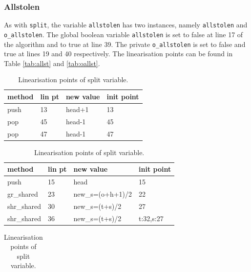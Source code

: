\documentclass{sig-alternate-br}
\begin{document}
\subsubsection{Allstolen}
As with \texttt{split}, the variable \texttt{allstolen} has two instances, namely \texttt{allstolen} and \texttt{o\_allstolen}.
The global boolean variable \texttt{allstolen} is set to false at line 17 of the algorithm and to true at line 39.
The private \texttt{o\_allstolen} is set to false and true at lines 19 and 40 respectively.
The linearisation points can be found in Table \ref{tab:allst} and \ref{tab:oallst}.
\begin{table}[h]
	\begin{subtable}[h]{0.45\textwidth}
		\centering
		\begin{tabular}{|l|l|l|l|}
			\hline
			\textbf{method} & \textbf{lin pt} & \textbf{new value} & \textbf{init point} \\ \hline
			push            & 13                 & head+1      & 13               \\ \hline
			pop             & 45                 & head-1      & 45               \\ \hline
			pop             & 47                 & head-1      & 47               \\ \hline
		\end{tabular}
		\caption{Linearisation points of head variable.}
		\label{tab:head}
	\end{subtable}
	\hfill
	\begin{subtable}[h]{0.45\textwidth}
		\centering
		\begin{tabular}{|l|l|l|l|}
			\hline
			\textbf{method} & \textbf{lin pt} & \textbf{new value} & \textbf{init point} \\ \hline
			push            & 15                 & head        		   & 15\\ \hline
			gr\_shared    & 23                 & new\_s=(o+h+1)/2 & 22\\ \hline
			shr\_shared  & 30                 & new\_s=(t+s)/2      & 27\\ \hline
			shr\_shared  & 36                 & new\_s=(t+s)/2      & t:32,s:27\\ \hline
		\end{tabular}
		\caption{Linearisation points of split variable.}
		\label{tab:split}
	\end{subtable}
	\hfill
	\begin{subtable}[h]{0.45\textwidth}
		\centering
		\begin{tabular}{|l|l|l|l|}

\end{tabular}
\end{subtable}
\end{table}
\end{document}
